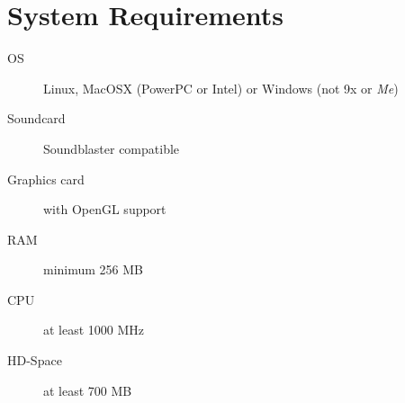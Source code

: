 \section{System Requirements}

\begin{description}
\item[OS] Linux, MacOSX (PowerPC or Intel) or Windows (not 9x or \emph{Me})
\item[Soundcard] Soundblaster compatible
\item[Graphics card] with OpenGL support
\item[RAM] minimum 256 MB
\item[CPU] at least 1000 MHz
\item[HD-Space] at least 700 MB
\end{description}
